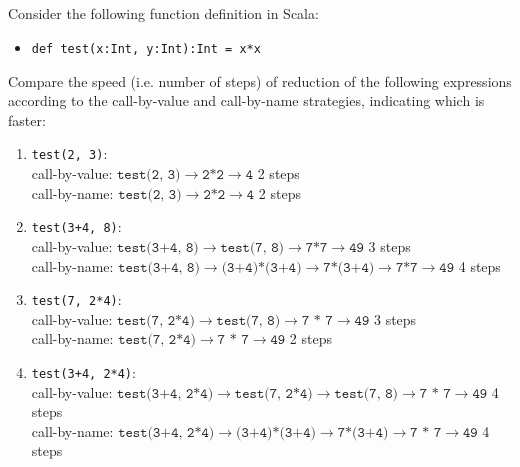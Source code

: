 \subsection{}

Consider the following function definition in Scala:
\begin{itemize}
\item \texttt{def test(x:Int, y:Int):Int = x*x}
\end{itemize}
Compare the speed (i.e. number of steps) of reduction of the following
expressions according to the call-by-value and call-by-name strategies,
indicating which is faster:
\begin{enumerate}
\item \texttt{test(2, 3)}:\\
  call-by-value: $\texttt{test(2, 3)} \to \texttt{2*2} \to \texttt{4}$ 2 steps\\
  call-by-name: $\texttt{test(2, 3)} \to \texttt{2*2} \to \texttt{4}$ 2 steps
\item \texttt{test(3+4, 8)}:\\
  call-by-value: $\texttt{test(3+4, 8)} \to \texttt{test(7, 8)} \to \texttt{7*7} \to \texttt{49}$ 3 steps\\
  call-by-name: $\texttt{test(3+4, 8)} \to \texttt{(3+4)*(3+4)} \to \texttt{7*(3+4)} \to \texttt{7*7} \to \texttt{49}$ 4 steps
\item \texttt{test(7, 2*4)}:\\
  call-by-value: $\texttt{test(7, 2*4)} \to \texttt{test(7, 8)} \to \texttt{7 * 7} \to \texttt{49}$ 3 steps\\
  call-by-name: $\texttt{test(7, 2*4)} \to \texttt{7 * 7} \to \texttt{49}$ 2 steps
\item \texttt{test(3+4, 2*4)}:\\
  call-by-value: $\texttt{test(3+4, 2*4)} \to \texttt{test(7, 2*4)} \to \texttt{test(7, 8)} \to \texttt{7 * 7} \to \texttt{49}$ 4 steps\\
  call-by-name: $\texttt{test(3+4, 2*4)} \to \texttt{(3+4)*(3+4)} \to \texttt{7*(3+4)} \to \texttt{7 * 7} \to \texttt{49}$ 4 steps
\end{enumerate}

